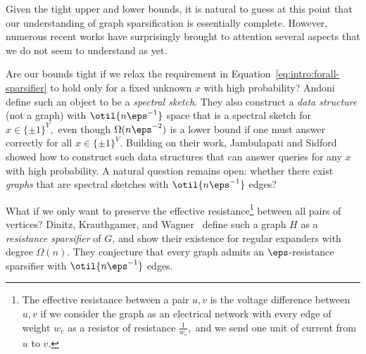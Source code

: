 Given the tight upper and lower bounds, it is natural to guess at this
point that our understanding of graph sparsification is essentially
complete. However, numerous recent works have surprisingly brought to
attention several aspects that we do not seem to understand as yet.
\begin{tight_enumerate}
\item Are our bounds tight if we relax the requirement in
  Equation~\eqref{eq:intro:forall-sparsifier} to hold only for a fixed
  unknown $x$ with high probability?  Andoni
  \etal~\cite{AndoniCKQWZ16} define such an object to be a
  \emph{spectral sketch}. They also construct a \emph{data structure}
  (not a graph) with $\otil{n\eps^{-1}}$ space that is a spectral
  sketch for $x \in \{\pm 1\}^{V},$ even though $\Omega(n\eps^{-2})$
  is a lower bound if one must answer correctly for all
  $x \in \{\pm 1\}^{V}.$
  Building on
  their work, Jambulapati and Sidford~\cite{JambulapatiS18} showed how
  to construct such data structures that can answer queries for any
  $x$ with high probability. A natural question remains open: whether
  there exist \emph{graphs} that are spectral sketches with
  $\otil{n\eps^{-1}}$ edges?




  
\item What if we only want to preserve the effective
  resistance\footnote{The effective resistance between a pair $u,v$ is
    the voltage difference between $u, v$ if we consider the graph as
    an electrical network with every edge of weight $w_e$ as a
    resistor of resistance $\frac{1}{w_e},$ and we send one unit of
    current from $u$ to $v.$ } between all pairs of vertices?  Dinitz,
  Krauthgamer, and Wagner~\cite{DinitzKW15} define such a graph $H$ as a
  \emph{resistance sparsifier} of $G$, and show their existence for
  regular expanders with degree $\Omega(n).$ They conjecture that
  every graph admits an $\eps$-resistance sparsifier with
  $\otil{n\eps^{-1}}$ edges.
  

\end{tight_enumerate}
